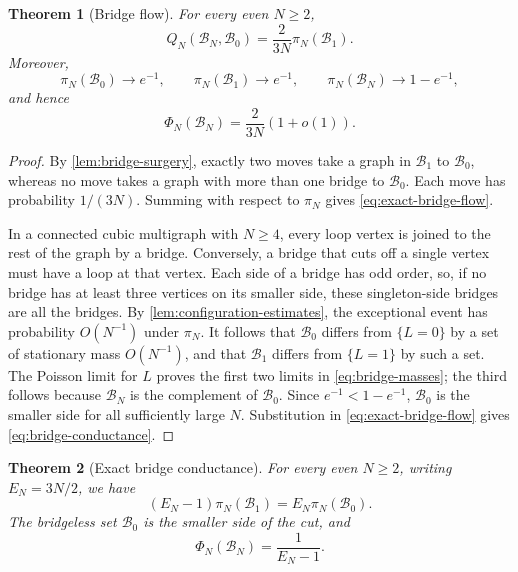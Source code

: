 \documentclass[11pt]{article}
\theoremstyle{plain}
\newtheorem{theorem}{Theorem}[section]
\theoremstyle{definition}
\numberwithin{equation}{section}
\begin{document}
\begin{theorem}[Bridge flow]\label{thm:bridge-flow}
For every even $N\geq2$,
\begin{equation}\label{eq:exact-bridge-flow}
  Q_N(\mathcal B_N,\mathcal B_0)
  =\frac{2}{3N}\pi_N(\mathcal B_1).
\end{equation}
Moreover,
\begin{equation}\label{eq:bridge-masses}
  \pi_N(\mathcal B_0)\longrightarrow e^{-1},
  \qquad
  \pi_N(\mathcal B_1)\longrightarrow e^{-1},
  \qquad
  \pi_N(\mathcal B_N)\longrightarrow1-e^{-1},
\end{equation}
and hence
\begin{equation}\label{eq:bridge-conductance}
  \Phi_N(\mathcal B_N)=\frac{2}{3N}(1+o(1)).
\end{equation}
\end{theorem}

\begin{proof}
By \cref{lem:bridge-surgery}, exactly two moves take a graph in
$\mathcal B_1$ to $\mathcal B_0$, whereas no move takes a graph with more
than one bridge to $\mathcal B_0$.  Each move has probability $1/(3N)$.
Summing with respect to $\pi_N$ gives \eqref{eq:exact-bridge-flow}.

In a connected cubic multigraph with $N\geq4$, every loop vertex is joined to
the rest of the graph by a bridge.  Conversely, a bridge that cuts off a single
vertex must have a loop at that vertex.  Each side of a bridge has odd order,
so, if no bridge has at least three vertices on its smaller side, these
singleton-side bridges are all the bridges.  By
\cref{lem:configuration-estimates}, the exceptional event has probability
$O(N^{-1})$ under $\pi_N$.  It follows that $\mathcal B_0$ differs from
$\{L=0\}$ by a set of stationary mass $O(N^{-1})$, and that
$\mathcal B_1$ differs from $\{L=1\}$ by such a set.  The Poisson limit for
$L$ proves the first two limits in \eqref{eq:bridge-masses}; the third follows
because $\mathcal B_N$ is the complement of $\mathcal B_0$.
Since $e^{-1}<1-e^{-1}$, $\mathcal B_0$ is the smaller
side for all sufficiently large $N$.  Substitution in
\eqref{eq:exact-bridge-flow} gives \eqref{eq:bridge-conductance}.
\end{proof}

\begin{theorem}[Exact bridge conductance]\label{thm:exact-conductance}
For every even $N\geq2$, writing $E_N=3N/2$, we have
\begin{equation}\label{eq:bridge-mass-ratio}
 (E_N-1)\pi_N(\mathcal B_1)=E_N\pi_N(\mathcal B_0).
\end{equation}
The bridgeless set $\mathcal B_0$ is the smaller side of the cut, and
\begin{equation}\label{eq:finite-identity}
 \Phi_N(\mathcal B_N)=\frac{1}{E_N-1}.
\end{equation}
\end{theorem}
\end{document}
